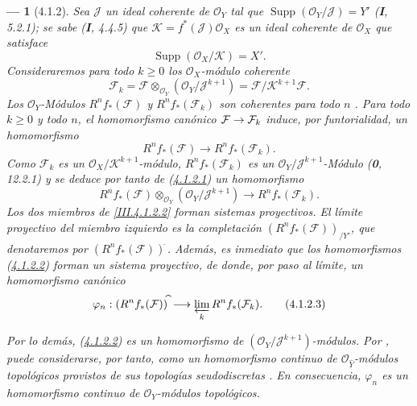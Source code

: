 \documentclass[10pt,oneside,openany]{book}
\theoremstyle{egaenv}\newtheorem*{env}{---}
\theoremstyle{egastatement}
\theoremstyle{egadescription}
\renewcommand{\geq}{\geqslant}
\renewcommand{\to}{\mathchoice{\longrightarrow}{\rightarrow}{\rightarrow}{\rightarrow}}
\begin{document}
\begin{env}[4.1.2]
\label{III.4.1.2}
\label{III.4.1.2-fr}
Sea $\mathcal J$ un ideal coherente de $\mathcal O_Y$ tal que
$\operatorname{Supp}(\mathcal O_Y/\mathcal J)=Y'$ (\textbf{I}, 5.2.1); se sabe (\textbf{I}, 4.4.5) que $\mathcal K=f^*(\mathcal J)\mathcal O_X$
es un ideal coherente de $\mathcal O_X$ que satisface
\[
\operatorname{Supp}(\mathcal O_X/\mathcal K)=X'.
\]
Consideraremos para todo $k\geq0$ los $\mathcal O_X$-módulo coherente
\[
\mathcal F_k
=\mathcal F\otimes_{\mathcal O_Y}(\mathcal O_Y/\mathcal J^{k+1})
=\mathcal F/\mathcal K^{k+1}\mathcal F.
\]
Los $\mathcal O_Y$-Módulos $R^nf_*(\mathcal F)$ y
$R^nf_*(\mathcal F_k)$ son \emph{coherentes} para todo $n$ .
Para todo $k\geq0$ y todo $n$, el homomorfismo canónico
$\mathcal F\to\mathcal F_k$ induce, por funtorialidad, un homomorfismo
\[
R^nf_*(\mathcal F)\longrightarrow R^nf_*(\mathcal F_k).
\tag{4.1.2.1}\label{III.4.1.2.1-fr}
\]
Como $\mathcal F_k$ es un $\mathcal O_X/\mathcal K^{k+1}$-módulo,
$R^nf_*(\mathcal F_k)$ es un
$\mathcal O_Y/\mathcal J^{k+1}$-Módulo (\textbf{0}, 12.2.1) y se deduce por tanto de (\hyperref[III.4.1.2.1-fr]{4.1.2.1}) un homomorfismo \[
R^nf_*(\mathcal F)\otimes_{\mathcal O_Y}
(\mathcal O_Y/\mathcal J^{k+1})
\longrightarrow R^nf_*(\mathcal F_k).
\tag{4.1.2.2}\label{III.4.1.2.2-fr}
\]
Los dos miembros de \eqref{III.4.1.2.2} forman sistemas proyectivos.
El límite proyectivo del miembro izquierdo es la \emph{completación}
$(R^nf_*(\mathcal F))_{/Y'}$, que denotaremos por
$(R^nf_*(\mathcal F))^{\widehat{\,}}$. Además, es inmediato que los
homomorfismos (\hyperref[III.4.1.2.2-fr]{4.1.2.2}) forman un sistema
proyectivo, de donde, por paso al límite, un \emph{homomorfismo canónico}
\[
\varphi_n:(R^nf_*(\mathcal F))^{\widehat{\,}}
\longrightarrow\varprojlim_kR^nf_*(\mathcal F_k).
\tag{4.1.2.3}\label{III.4.1.2.3-fr}
\]

Por lo demás, (\hyperref[III.4.1.2.2-fr]{4.1.2.2}) es un homomorfismo de
$(\mathcal O_Y/\mathcal J^{k+1})$-módulos.
Por , puede considerarse, por tanto, como un
homomorfismo continuo de $\mathcal O_{\widehat Y}$-módulos topológicos
provistos de sus topologías seudodiscretas .
En consecuencia, $\varphi_n$ es un homomorfismo \emph{continuo} de
$\mathcal O_Y$-módulos topológicos.
\end{env}
\end{document}
